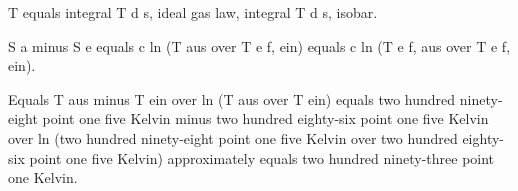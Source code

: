 T equals integral T d s, ideal gas law, integral T d s, isobar.

S a minus S e equals c ln (T aus over T e f, ein) equals c ln (T e f, aus over T e f, ein).

Equals T aus minus T ein over ln (T aus over T ein) equals two hundred ninety-eight point one five Kelvin minus two hundred eighty-six point one five Kelvin over ln (two hundred ninety-eight point one five Kelvin over two hundred eighty-six point one five Kelvin) approximately equals two hundred ninety-three point one Kelvin.